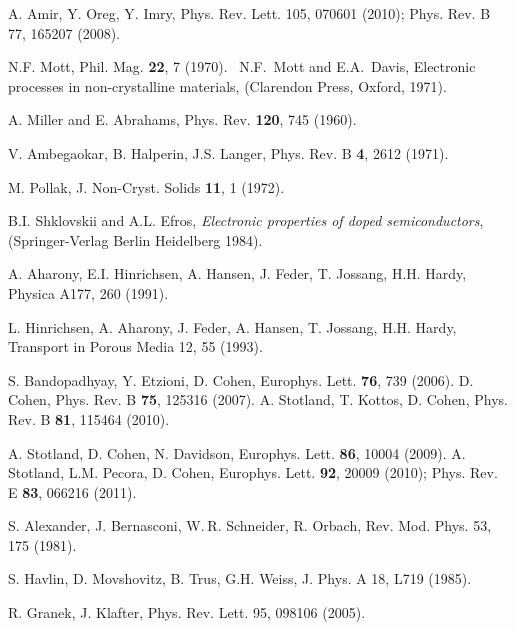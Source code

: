 \documentclass[aps,pre,floats,floatfix,twocolumn]{revtex4}
\newcommand{\rmrk}[1]{#1}
\begin{document}
\begin{thebibliography}{99}
A. Amir, Y. Oreg, Y. Imry,
Phys. Rev. Lett. 105, 070601 (2010); 
%
Phys. Rev. B 77, 165207 (2008).



N.F. Mott, Phil. Mag. {\bf 22}, 7 (1970). 
\ N.F.~Mott and E.A.~Davis, 
Electronic processes in non-crystalline materials, 
(Clarendon Press, Oxford, 1971). 

A. Miller and E. Abrahams, Phys. Rev. {\bf 120}, 745 (1960).

V. Ambegaokar, B. Halperin, J.S. Langer, 
Phys. Rev. B {\bf 4}, 2612 (1971). 


M. Pollak, J. Non-Cryst. Solids {\bf 11}, 1 (1972).

B.I. Shklovskii and A.L. Efros, 
{\em Electronic properties of doped semiconductors},
(Springer-Verlag Berlin Heidelberg 1984).




A. Aharony, E.I. Hinrichsen, A. Hansen, J. Feder, T. Jossang, H.H. Hardy,  
Physica A177, 260 (1991). 

L. Hinrichsen, A. Aharony, J. Feder, A. Hansen, T. Jossang, H.H. Hardy, 
Transport in Porous Media 12, 55 (1993). 




%
S. Bandopadhyay, Y. Etzioni, D. Cohen,
Europhys. Lett. {\bf 76}, 739 (2006).
%
D. Cohen,
Phys. Rev. B {\bf 75}, 125316 (2007).
%
A. Stotland, T. Kottos, D. Cohen, 
Phys. Rev. B {\bf 81}, 115464 (2010). 


%
A. Stotland, D. Cohen, N. Davidson, 
Europhys. Lett. {\bf 86}, 10004 (2009).
%
A. Stotland, L.M. Pecora, D. Cohen, 
Europhys. Lett. {\bf 92}, 20009 (2010);
Phys. Rev. E {\bf 83}, 066216 (2011).



S. Alexander, J. Bernasconi, W. R. Schneider, R. Orbach, 
Rev. Mod. Phys. 53, 175 (1981).

\rmrk{S. Havlin, D. Movshovitz, B. Trus, G.H. Weiss,}
J. Phys. A 18, L719 (1985).

R. Granek, J. Klafter, Phys. Rev. Lett. 95, 098106 (2005).


\end{thebibliography}
\end{document}

